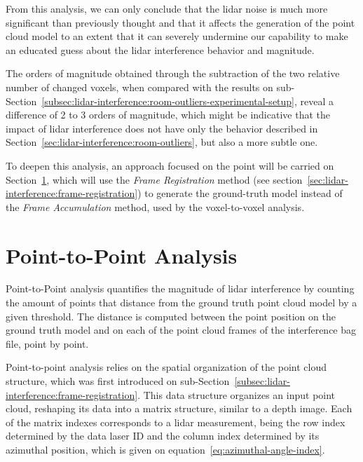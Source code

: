 From this analysis, we can only conclude that the \ac{lidar} noise is much more significant than previously thought and that it affects the generation of the point cloud model to an extent that it can severely undermine our capability to make an educated guess about the \ac{lidar} interference behavior and magnitude.

The orders of magnitude obtained through the subtraction of the two relative number of changed voxels, when compared with the results on sub-Section~\ref{subsec:lidar-interference:room-outliers-experimental-setup}, reveal a difference of 2 to 3 orders of magnitude, which might be indicative that the impact of \ac{lidar} interference does not have only the behavior described in Section~\ref{sec:lidar-interference:room-outliers}, but also a more subtle one.

To deepen this analysis, an approach focused on the point will be carried on Section~\ref{sec:lidar-interference:point-to-point-analysis}, which will use the \textit{Frame Registration} method (see section~\ref{sec:lidar-interference:frame-registration}) to generate the ground-truth model instead of the \textit{Frame Accumulation} method, used by the voxel-to-voxel analysis.



\section{Point-to-Point Analysis}
\label{sec:lidar-interference:point-to-point-analysis}
Point-to-Point analysis quantifies the magnitude of \ac{lidar} interference by counting the amount of points that distance from the ground truth point cloud model by a given threshold. The distance is computed between the point position on the ground truth model and on each of the point cloud frames of the interference bag file, point by point.

Point-to-point analysis relies on the spatial organization of the point cloud structure, which was first introduced on sub-Section~\ref{subsec:lidar-interference:frame-registration}. This data structure organizes an input point cloud, reshaping its data into a matrix structure, similar to a depth image. Each of the matrix indexes corresponds to a \ac{lidar} measurement, being the row index determined by the data \ac{laser} ID and the column index determined by its azimuthal position, which is given on equation~\ref{eq:azimuthal-angle-index}. 

